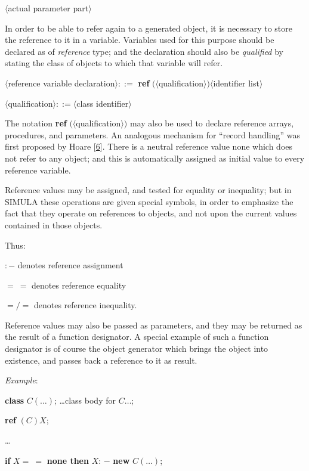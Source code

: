 \tabto*{11.6em}$\langle$actual parameter part$\rangle$

In order to be able to refer again to a generated object, it is necessary to store the reference to it in a variable. Variables used for this purpose should be declared as of \textit{reference} type; and the declaration should also be \textit{qualified} by stating the class of objects to which that variable will refer.

\quad $\langle$reference variable declaration$\rangle ::=$ \textbf{ref} $(\langle $qualification$\rangle) \langle$identifier list$\rangle$

\quad $\langle$qualification$\rangle ::= \langle$class identifier$\rangle$

\noindent
The notation \textbf{ref} $(\langle$qualification$\rangle)$ may also be used to declare reference arrays, procedures, and parameters. An analogous mechanism for ``record handling'' was first proposed by Hoare [\hyperref[ref:6]{6}]. There is a neutral reference value none which does not refer to any object; and this is automatically assigned as initial value to every reference variable.

Reference values may be assigned, and tested for equality or inequality; but in SIMULA these operations are given special symbols, in order to emphasize the fact that they operate on references to objects, and not upon the current values contained in those objects.

\noindent
Thus:

\quad $:-$\tabto*{5.6em} denotes reference assignment

\quad $=\ =$\tabto*{5.6em} denotes reference equality

\quad $=/=$\tabto*{5.6em} denotes reference inequality.

\noindent
Reference values may also be passed as parameters, and they may be returned as the result of a function designator. A special example of such a function designator is of course the object generator which brings the object into existence, and passes back a reference to it as result.

\noindent
\textit{Example}:

\quad \textbf{class} $C(\dots)$; \dots class body for $C\dots$;

\quad \textbf{ref} $(C)X$;

\qquad \dots

\qquad \textbf{if} $X =\ =$ \textbf{none then} $X$: $-$ \textbf{new} $C(\dots)$;

